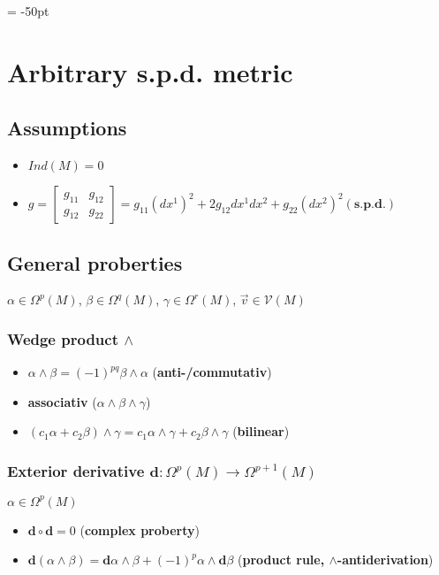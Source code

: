 \documentclass{scrartcl}
\newcommand{\exd}{\mathbf{d}}
\begin{document}
\hoffset = -50pt

  \section{Arbitrary s.p.d. metric}
    \subsection{Assumptions}
      \begin{itemize}
        \item \( Ind(M) = 0 \)
        \item \( g =
      \begin{bmatrix}
        g_{11} & g_{12} \\
        g_{12} & g_{22}
      \end{bmatrix}  = g_{11}\left( dx^{1} \right)^{2} + 2g_{12}dx^{1}dx^{2} + g_{22}\left( dx^{2} \right)^{2}
        (\textbf{s.p.d.}) \)
      \end{itemize}

    \subsection{General proberties}
      \( \alpha \in \Omega^{p}(M) \),  \( \beta \in \Omega^{q}(M) \),  \( \gamma \in \Omega^{r}(M) \),
      \( \vec{v} \in \mathcal{V}(M) \)
      \subsubsection{Wedge product \( \wedge \)}
      \begin{itemize}
        \item \( \alpha\wedge\beta = (-1)^{pq}\beta\wedge\alpha \)
            (\textbf{anti-/commutativ})
        \item \textbf{associativ} (\( \alpha\wedge\beta\wedge\gamma \))
        \item \( \left( c_{1}\alpha + c_{2}\beta \right)\wedge\gamma
                  = c_{1}\alpha\wedge\gamma + c_{2}\beta\wedge\gamma\)
              (\textbf{bilinear})
      \end{itemize}

      \subsubsection{Exterior derivative \( \exd:\Omega^{p}(M)\rightarrow\Omega^{p+1}(M) \)}
        \( \alpha\in\Omega^{p}(M) \)
        \begin{itemize}
          \item \( \exd\circ\exd = 0 \) (\textbf{complex proberty})
          \item \( \exd\left( \alpha \wedge \beta \right) = \exd\alpha\wedge\beta + (-1)^{p}\alpha\wedge\exd\beta \)
                (\textbf{product rule, \( \wedge \)-antiderivation})
        \end{itemize}
\end{document}
